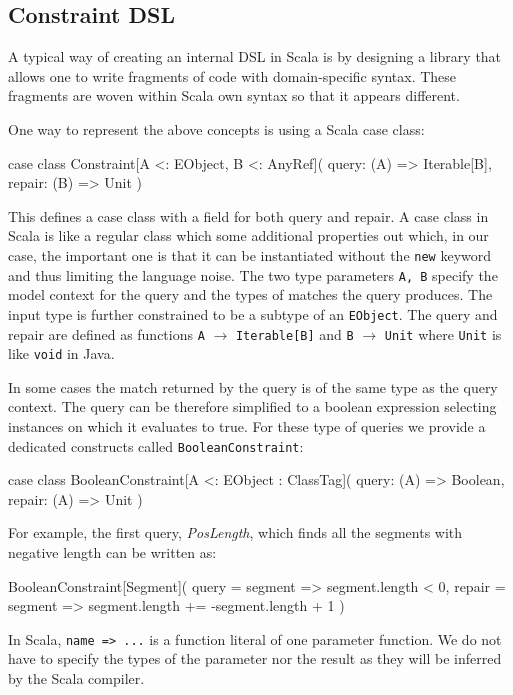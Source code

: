 \subsection{Constraint DSL}

A typical way of creating an internal DSL in Scala is by designing a library that allows one to write fragments of code with domain-specific syntax.
These fragments are woven within Scala own syntax so that it appears different.

One way to represent the above concepts is using a Scala case class:
%
\begin{scalacode}
case class Constraint[A <: EObject, B <: AnyRef](
  query: (A) => Iterable[B],
  repair: (B) => Unit
)
\end{scalacode}
%
This defines a case class with a field for both query and repair.
A case class in Scala is like a regular class which some additional properties out which, in our case, the important one is that it can be instantiated without the \texttt{new} keyword and thus limiting the language noise.
The two type parameters \texttt{A, B} specify the model context for the query and the types of matches the query produces.
The input type is further constrained to be a subtype of an \texttt{EObject}.
The query and repair are defined as functions \texttt{A} $\rightarrow$ \texttt{Iterable[B]} and \texttt{B} $\rightarrow$ \texttt{Unit} where \texttt{Unit} is like \texttt{void} in Java.

In some cases the match returned by the query is of the same type as the query context.
The query can be therefore simplified to a boolean expression selecting instances on which it evaluates to true.
For these type of queries we provide a dedicated constructs called \texttt{BooleanConstraint}:
%
\begin{scalacode}
case class BooleanConstraint[A <: EObject : ClassTag](
  query: (A) => Boolean, 
  repair: (A) => Unit
)
\end{scalacode}

For example, the first query, \emph{PosLength}, which finds all the segments with negative length can be written as:
%
\begin{scalacode}
BooleanConstraint[Segment](
  query = segment => segment.length < 0,
  repair = segment => segment.length += -segment.length + 1
)
\end{scalacode}
%
In Scala, \texttt{name => ...} is a function literal of one parameter function.
We do not have to specify the types of the parameter nor the result as they will be inferred by the Scala compiler.

